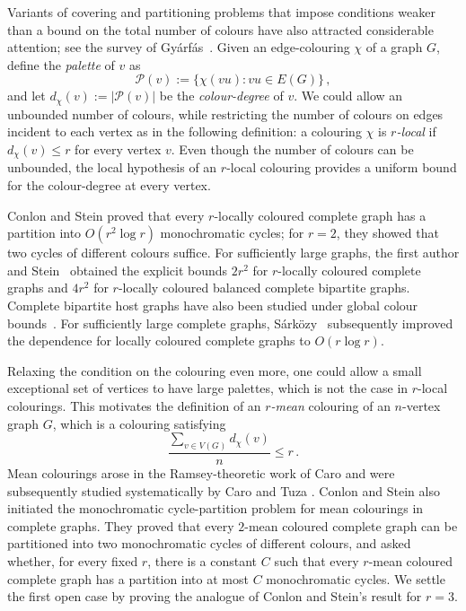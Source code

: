 \documentclass[a4paper,12pt,reqno]{amsart}
\newcommand{\cP}{\mathcal P}
\newcommand{\dd}{d_{\chi}}
\begin{document}
Variants of covering and partitioning problems that impose conditions 
weaker than a bound on the total number of colours have also attracted
considerable attention; see the survey of Gy\'arf\'as~\cite{Gyarfas2016}. Given
an edge-colouring $\chi$ of a graph $G$, define the \emph{palette} of $v$ as
  \[
  \cP(v):=\{\chi(vu)\colon vu\in E(G)\}\,,
  \]
and let $\dd(v):=|\cP(v)|$ be the \emph{colour-degree} of $v$. We could allow an
unbounded number of colours, while restricting the number of colours on edges
incident to each vertex as in the following definition: a colouring $\chi$ is
\emph{$r$-local} if $\dd(v)\le r$ for every vertex $v$. Even though the number
of colours can be unbounded, the local hypothesis of an $r$-local colouring
provides a uniform bound for the colour-degree at every vertex.

Conlon and Stein \cite{ConlonStein2016} proved that every $r$-locally coloured
complete graph has a partition into $O(r^2\log r)$ monochromatic cycles; for
$r=2$, they showed that two cycles of different colours suffice. For
sufficiently large graphs, the first author and Stein~\cite{LangStein2017}
obtained the explicit bounds $2r^2$ for $r$-locally coloured complete graphs
and $4r^2$ for $r$-locally coloured balanced complete bipartite graphs.
Complete bipartite host graphs have also been studied under global colour
bounds~\cite{BenevidesQuintinoTalon2025,Haxell1997,
LangSchaudtStein2017}. For sufficiently large complete graphs,
S\'ark\"ozy~\cite{Sarkozy2020} subsequently improved the dependence for
locally coloured complete graphs to $O(r\log r)$.

Relaxing the condition on the colouring even more, one could allow a small
exceptional set of vertices to have large palettes, which is not the
case in $r$-local colourings. This motivates the definition of an
\emph{$r$-mean} colouring of an $n$-vertex graph $G$, which is a colouring satisfying 
\[
  \frac{\sum_{v\in V(G)}\dd(v)}{n} \le r\,.
\]
Mean colourings arose in the Ramsey-theoretic work of Caro \cite{Caro1992} and
were subsequently studied systematically by Caro and Tuza \cite{CaroTuza1993}.
Conlon and Stein also initiated the monochromatic cycle-partition problem for
mean colourings in complete graphs. They proved that every $2$-mean coloured
complete graph can be partitioned into two monochromatic cycles of different
colours, and asked whether, for every fixed $r$, there is a constant $C$ such
that every $r$-mean coloured complete graph has a partition into at most $C$
monochromatic cycles. We settle the first open case by proving the analogue of
Conlon and Stein's result for $r=3$. 
\end{document}

